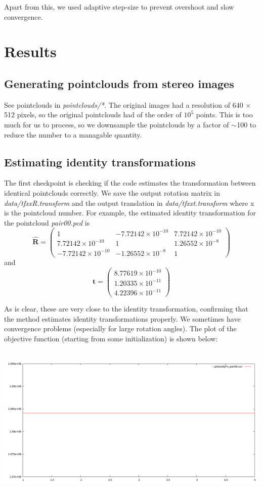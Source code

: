 \documentclass[11pt, a4paper]{article}
\begin{document}
\noindent Apart from this, we used adaptive step-size to prevent overshoot and slow convergence.

\section{Results}
\subsection{Generating pointclouds from stereo images}
See pointclouds in \textit{pointclouds/*}. The original images had a resolution of 640 $\times$ 512 pixels, so the original pointclouds had of the order of $10^5$ points. This is too much for us to process, so we downsample the pointclouds by a factor of $\sim$100 to reduce the number to a managable quantity.

\subsection{Estimating identity transformations}
The first checkpoint is checking if the code estimates the transformation between identical pointclouds correctly. We save the output rotation matrix in \textit{data/tfxxR.transform} and the output translation in \textit{data/tfxxt.transform} where x is the pointcloud number. For example, the estimated identity transformation for the pointcloud \textit{pair00.pcd} is $$\hat{\textbf{R}} = \begin{pmatrix}
1 & -7.72142 \times 10^{-10} & 7.72142 \times 10^{-10} \\
7.72142 \times 10^{-10} & 1 & 1.26552 \times 10^{-8} \\
-7.72142 \times 10^{-10} & -1.26552 \times 10^{-8} & 1
 \end{pmatrix}$$ and $$\hat{\textbf{t}} = \begin{pmatrix}
8.77619 \times 10^{-10} \\
1.20335 \times 10^{-11} \\
4.22396 \times 10^{-11}
 \end{pmatrix}$$

\noindent As is clear, these are very close to the identity transformation, confirming that the method estimates identity transformations properly. We sometimes have convergence problems (especially for large rotation angles). The plot of the objective function (starting from some initialization) is shown below: \\ \\
\centerline{\includegraphics[scale=0.35]{objFn_pair00}}
\end{document}
